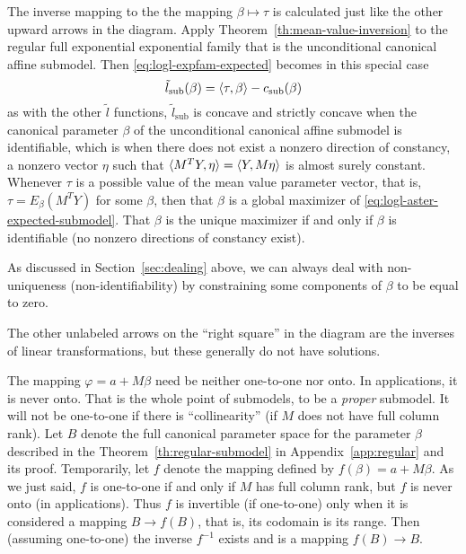 The inverse mapping to the the mapping $\beta \mapsto \tau$ is calculated
just like the other upward arrows in the diagram.
Apply Theorem~\ref{th:mean-value-inversion} to the regular
full exponential exponential family that is
the unconditional canonical affine submodel.
Then \eqref{eq:logl-expfam-expected} becomes in this special case
\begin{equation} \label{eq:logl-aster-expected-submodel}
   \tilde{l}_\text{sub}(\beta) = \langle \tau, \beta \rangle - c_\text{sub}(\beta)
\end{equation}
as with the other $\tilde{l}$ functions, $\tilde{l}_\text{sub}$ is concave
and strictly concave when the canonical parameter $\beta$ of the unconditional
canonical affine submodel is identifiable, which is when there does not
exist a nonzero direction of constancy, a nonzero vector $\eta$ such that
$\langle M^T Y, \eta \rangle = \langle Y, M \eta \rangle$ is almost surely constant.
Whenever $\tau$ is a possible value of the mean value parameter vector,
that is, $\tau = E_\beta(M^T Y)$ for some $\beta$, then that $\beta$
is a global maximizer of \eqref{eq:logl-aster-expected-submodel}.
That $\beta$ is the unique maximizer if and only if $\beta$ is identifiable
(no nonzero directions of constancy exist).

As discussed in Section~\ref{sec:dealing} above, we can always deal with
non-uniqueness (non-identifiability) by constraining some components of
$\beta$ to be equal to zero.

The other unlabeled arrows on the ``right square'' in the diagram are the
inverses of linear transformations, but these generally do not have solutions.

The mapping $\varphi = a + M \beta$ need be neither one-to-one nor onto.
In applications, it is never onto.  That is the whole point of submodels,
to be a \emph{proper} submodel.  It will not be one-to-one if there is
``collinearity'' (if $M$ does not have full column rank).  Let $B$ denote
the full canonical parameter space for the parameter $\beta$ described in
the Theorem~\ref{th:regular-submodel} in Appendix~\ref{app:regular} and its
proof.  Temporarily, let $f$ denote the mapping defined
by $f(\beta) = a + M \beta$.  As we just said, $f$ is one-to-one if and only
if $M$ has full column rank, but $f$ is never onto (in applications).
Thus $f$ is invertible (if one-to-one) only when it is considered a mapping
$B \to f(B)$, that is, its codomain is its range.  Then (assuming one-to-one)
the inverse $f^{-1}$ exists and is a mapping $f(B) \to B$.

